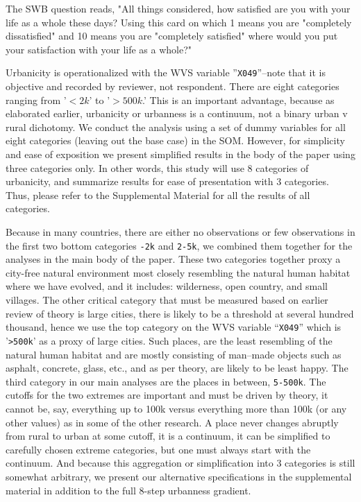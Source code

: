 \documentclass[10pt, letterpaper]{article}
\begin{document}
The SWB question reads, "All things considered, how  satisfied are you with your life as a whole these days? Using this card on which 1 means you are "completely dissatisfied" and 10 means you are "completely satisfied" where would you put your satisfaction with your life as a whole?"

Urbanicity is operationalized with the WVS variable ''\texttt{X049}''--note that it is objective and recorded by reviewer, not respondent.
There are eight categories ranging from '$<2k$' to '$>500k$.' This is an important advantage, because as elaborated earlier, urbanicity or urbanness is a continuum, not a binary urban v rural dichotomy. We conduct the analysis using a set of dummy variables for all eight categories (leaving out the base case) in the SOM. However, for simplicity and ease of exposition we present simplified results in the body of the paper using three categories only.
In other words, this study will use 8 categories of urbanicity, and summarize results for ease of presentation with 3 categories. Thus, please refer to the Supplemental Material for all the results of all categories.

Because in many countries, there are either no observations or few observations
in the first two bottom categories \texttt{-2k} and \texttt{2-5k}, we combined
them together for the analyses in the main body of the paper. These two
categories together proxy a city-free natural environment most closely resembling the natural human habitat where we have evolved, and it includes: wilderness, open country, and small villages. The other critical category that must be measured based on earlier review of theory is large cities, there is likely to be a threshold at several hundred thousand, hence we use the top category on the WVS variable ``\texttt{X049}'' which is '\texttt{>500k}' as a proxy of large cities. Such places, are the least resembling of the natural human habitat and are
mostly consisting of man--made objects such as asphalt, concrete, glass, etc., and
as per theory, are likely to be least happy. The third category in our main analyses are the places in between, \texttt{5-500k}.
%
The cutoffs for the two extremes are important and must be driven by theory, it cannot be, say, everything up to 100k versus everything more than 100k (or any other values) as in some of the other research. A place never changes abruptly from rural to urban at some cutoff, it is a continuum, it can be simplified to carefully chosen extreme categories, but one must always start with the continuum.
%
And because this aggregation or simplification into 3 categories is still
somewhat arbitrary, we present our alternative specifications in the supplemental material in addition to the full 8-step urbanness gradient. 
\end{document}
